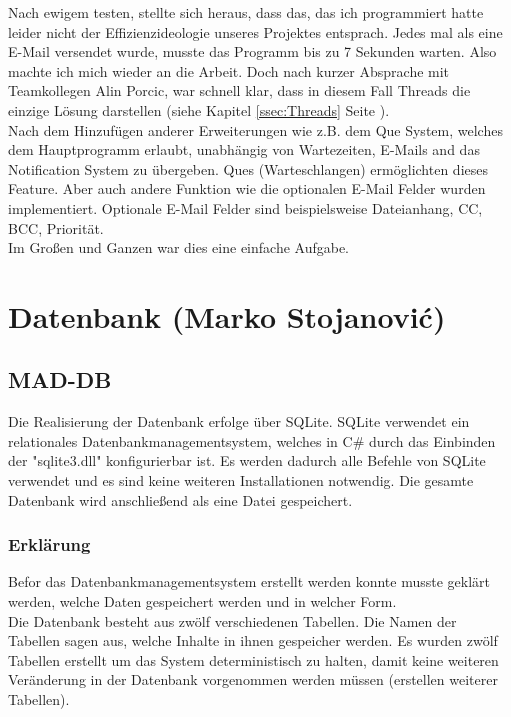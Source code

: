 \documentclass[12pt,a4paper]{report}
\begin{document}
\begin{onehalfspace}
Nach ewigem testen, stellte sich heraus, dass das, das ich programmiert hatte leider nicht der Effizienzideologie unseres Projektes entsprach. Jedes mal als eine E-Mail versendet wurde, musste das Programm bis zu 7 Sekunden warten. Also machte ich mich wieder an die Arbeit. Doch nach kurzer Absprache mit Teamkollegen Alin Porcic, war schnell klar, dass in diesem Fall Threads die einzige Lösung darstellen (siehe Kapitel \ref{ssec:Threads} Seite \pageref{ssec:Threads}).\\

Nach dem Hinzufügen anderer Erweiterungen wie z.B. dem Que System, welches dem Hauptprogramm erlaubt, unabhängig von Wartezeiten, E-Mails and das Notification System zu übergeben. Ques (Warteschlangen) ermöglichten dieses Feature. Aber auch andere Funktion wie die optionalen E-Mail Felder wurden implementiert. Optionale E-Mail Felder sind beispielsweise Dateianhang, CC, BCC, Priorität.\\

Im Großen und Ganzen war dies eine einfache Aufgabe.

\chapter{Datenbank (Marko Stojanovi\'{c})}

\section{MAD-DB}
Die Realisierung der Datenbank erfolge über SQLite. SQLite verwendet ein relationales Datenbankmanagementsystem, welches in C\# durch das Einbinden der "{}sqlite3.dll"{} konfigurierbar ist. Es werden dadurch alle Befehle von SQLite verwendet und es sind keine weiteren Installationen notwendig. Die gesamte Datenbank wird anschließend als eine Datei gespeichert.

\subsection{Erklärung}
Befor das Datenbankmanagementsystem erstellt werden konnte musste geklärt werden, welche Daten gespeichert werden und in welcher Form.\\

Die Datenbank besteht aus zwölf verschiedenen Tabellen. Die Namen der Tabellen sagen aus, welche Inhalte in ihnen gespeicher werden. Es wurden zwölf Tabellen erstellt um das System deterministisch zu halten, damit keine weiteren Veränderung in der Datenbank vorgenommen werden müssen (erstellen weiterer Tabellen).\\


\end{onehalfspace}
\end{document}
